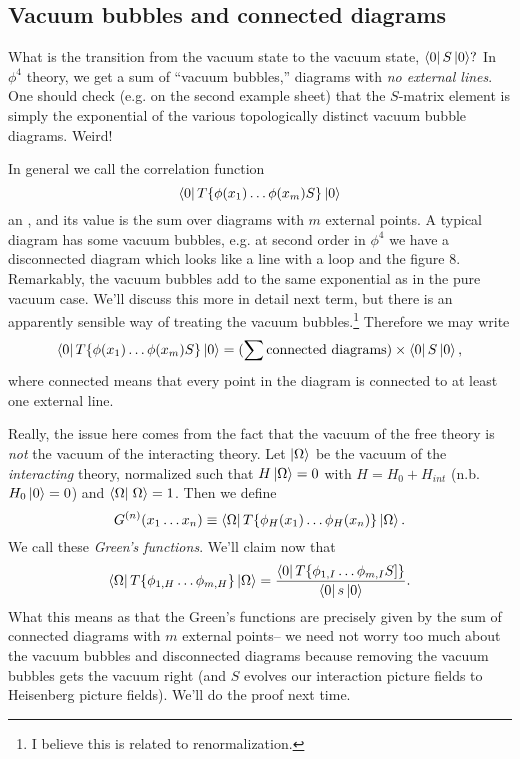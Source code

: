 \subsection*{Vacuum bubbles and connected diagrams} What is the transition from the vacuum state to the vacuum state, $\left< 0 \right|S\left| 0 \right>?$
In $\phi^4$ theory, we get a sum of ``vacuum bubbles,'' diagrams with \emph{no external lines}. One should check (e.g. on the second example sheet) that the $S$-matrix element is simply the exponential of the various topologically distinct vacuum bubble diagrams. Weird!%

In general we call the correlation function
$$\left< 0 \right|T\{\phi(x_1)\ldots \phi(x_m) S\}\left| 0 \right>$$
an , and its value is the sum over diagrams with $m$ external points. A typical diagram has some vacuum bubbles, e.g. at second order in $\phi^4$ we have a disconnected diagram which looks like a line with a loop and the figure 8. Remarkably, the vacuum bubbles add to the same exponential as in the pure vacuum case. We'll discuss this more in detail next term, but there is an apparently sensible way of treating the vacuum bubbles.\footnote{I believe this is related to renormalization.} Therefore we may write
$$\left< 0 \right|T\{\phi(x_1)\ldots \phi(x_m) S\}\left| 0 \right>=(\sum \text{connected diagrams})\times \left< 0 \right|S\left| 0 \right>,$$
where connected means that every point in the diagram is connected to at least one external line.

Really, the issue here comes from the fact that the vacuum of the free theory is \emph{not} the vacuum of the interacting theory. Let $\left| \Omega \right>$ be the vacuum of the \emph{interacting} theory, normalized such that
$H\left| \Omega \right>=0$ with $H=H_0+H_{int}$ (n.b. $H_0\left| 0 \right>=0$) and $\braket{\Omega}{\Omega}=1$. Then we define
$$G^{(n)}(x_1\ldots x_n)\equiv \left< \Omega \right|T\{\phi_H (x_1)\ldots \phi_H(x_n)\}\left| \Omega \right>.$$
We call these \emph{Green's functions}. We'll claim now that
$$\left< \Omega \right|T\{\phi_{1,H}\ldots \phi_{m,H}\}\left| \Omega \right>=\frac{\left< 0 \right|T \{\phi_{1,I}\ldots \phi_{m,I}S]\}}{\left< 0 \right|s\left| 0 \right>}.$$
What this means as that the Green's functions are precisely given by the sum of connected diagrams with $m$ external points-- we need not worry too much about the vacuum bubbles and disconnected diagrams because removing the vacuum bubbles gets the vacuum right (and $S$ evolves our interaction picture fields to Heisenberg picture fields). We'll do the proof next time.